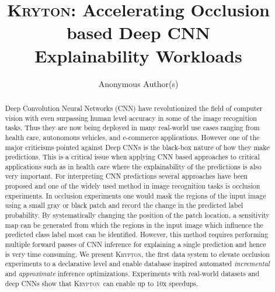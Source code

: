 \documentclass[10pt, sigconf]{acmart}
\newcommand{\system}{\textsc{Krypton}}
\begin{document}
\sloppy

\title{\textsc{Kryton}: Accelerating Occlusion based Deep CNN\\ Explainability Workloads}

\author{Anonymous Author(s)}


\begin{abstract}
Deep Convolution Neural Networks (CNN) have revolutionized the field of computer vision with even surpassing human level accuracy in some of the image recognition tasks. Thus they are now being deployed in many real-world use cases ranging from health care, autonomous vehicles, and e-commerce applications. However one of the major criticisms pointed against Deep CNNs is the black-box nature of how they make predictions. This is a critical issue when applying CNN based approaches to critical applications such as in health care where the explainability of the predictions is also very important. For interpreting CNN predictions several approaches have been proposed and one of the widely used method in image recognition tasks is occlusion experiments. In occlusion experiments one would mask the regions of the input image using a small gray or black patch and record the change in the predicted label probability. By systematically changing the position of the patch location, a sensitivity map can be generated from which the regions in the input image which influence the predicted class label most can be identified. However, this method requires performing multiple forward passes of CNN inference for explaining a single prediction and hence is very time consuming.
We present \system, the first data system to elevate occlusion experiments to a declarative level and enable database inspired automated \textit{incremental} and \textit{approximate} inference optimizations. Experiments with real-world datasets and deep CNNs show that \system~can enable up to 10x speedups.
\end{abstract}

\maketitle















\end{document}
